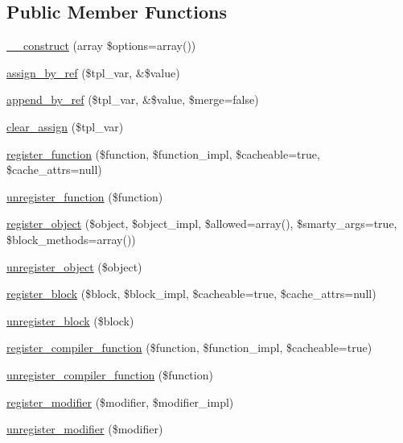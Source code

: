 \subsection*{Public Member Functions}
\begin{DoxyCompactItemize}
\item 
\hyperlink{class_smarty_b_c_a2d2b2afcd896367c740d1eb4b486614b}{\+\_\+\+\_\+construct} (array \$options=array())
\item 
\hyperlink{class_smarty_b_c_aebc96e36370712d0c9e5896db76bd487}{assign\+\_\+by\+\_\+ref} (\$tpl\+\_\+var, \&\$value)
\item 
\hyperlink{class_smarty_b_c_a1a744cb1e3d6473ddcd531412c54f07e}{append\+\_\+by\+\_\+ref} (\$tpl\+\_\+var, \&\$value, \$merge=false)
\item 
\hyperlink{class_smarty_b_c_ad0188dcb261ac235ac70c141f2e6657e}{clear\+\_\+assign} (\$tpl\+\_\+var)
\item 
\hyperlink{class_smarty_b_c_aa933e1e9fb0b13f22101de4acbaf699c}{register\+\_\+function} (\$function, \$function\+\_\+impl, \$cacheable=true, \$cache\+\_\+attrs=null)
\item 
\hyperlink{class_smarty_b_c_ae73d72302d6bcf8a0b284654b2ecef15}{unregister\+\_\+function} (\$function)
\item 
\hyperlink{class_smarty_b_c_a6d0b6c87a634b0c016f28972b624b4e4}{register\+\_\+object} (\$object, \$object\+\_\+impl, \$allowed=array(), \$smarty\+\_\+args=true, \$block\+\_\+methods=array())
\item 
\hyperlink{class_smarty_b_c_a49288d1943e174bcb8e924a4b449d050}{unregister\+\_\+object} (\$object)
\item 
\hyperlink{class_smarty_b_c_a2a6564c20eaeecdddd192885f9d5a794}{register\+\_\+block} (\$block, \$block\+\_\+impl, \$cacheable=true, \$cache\+\_\+attrs=null)
\item 
\hyperlink{class_smarty_b_c_aa27d55eff4bc63b71da604fb1af362c9}{unregister\+\_\+block} (\$block)
\item 
\hyperlink{class_smarty_b_c_a4b141e0b9a699098e8986aca16e871ca}{register\+\_\+compiler\+\_\+function} (\$function, \$function\+\_\+impl, \$cacheable=true)
\item 
\hyperlink{class_smarty_b_c_a85920043d6bf2ee895a1dc3fa2c464ca}{unregister\+\_\+compiler\+\_\+function} (\$function)
\item 
\hyperlink{class_smarty_b_c_ac1483efc4d74e159c9ddb29b33fbfcc0}{register\+\_\+modifier} (\$modifier, \$modifier\+\_\+impl)
\item 
\hyperlink{class_smarty_b_c_aa0efdcad7fc5a36846e5e8bd8a455dd9}{unregister\+\_\+modifier} (\$modifier)

\end{DoxyCompactItemize}
